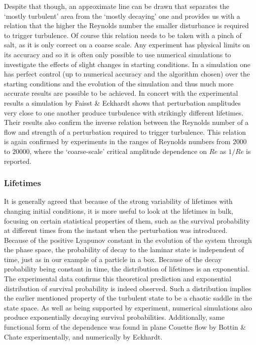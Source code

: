 \documentclass[11pt,a4paper]{article}
\begin{document}
Despite that though, an approximate line can be drawn that separates the `mostly turbulent' area from the `mostly decaying' one and provides us with a relation that the higher the Reynolds number the smaller disturbance is required to trigger turbulence.
Of course this relation needs to be taken with a pinch of salt, as it is only correct on a coarse scale\cite{Eckhardt07}.
Any experiment has physical limits on its accuracy and so it is often only possible to use numerical simulations to investigate the effects of slight changes in starting conditions.
In a simulation one has perfect control (up to numerical accuracy and the algorithm chosen) over the starting conditions and the evolution of the simulation and thus much more accurate results are possible to be achieved.
In concert with the experimental results a simulation by Faisst \& Eckhardt\cite{Faisst04} shows that perturbation amplitudes very close to one another produce turbulence with strikingly different lifetimes.
Their results also confirm the inverse relation between the Reynolds number of a flow and strength of a perturbation required to trigger turbulence.
This relation is again confirmed by experiments in the ranges of Reynolds numbers from \(2000\) to \(20000\), where the `coarse-scale' critical amplitude dependence on \(Re\) as \(1 / Re\) is reported\cite{Hof03}\cite{Hof04}\cite{Draad98}.

\subsubsection{Lifetimes}
It is generally agreed that because of the strong variability of lifetimes with changing initial conditions, it is more useful to look at the lifetimes in bulk, focusing on certain statistical properties of them, such as the survival probability at different times from the instant when the perturbation was introduced.
Because of the positive Lyapunov constant in the evolution of the system through the phase space, the probability of decay to the laminar state is independent of time, just as in our example of a particle in a box.
Because of the decay probability being constant in time, the distribution of lifetimes is an exponential\cite{Kadanoff84}.
The experimental data confirms this theoretical prediction and exponential distribution of survival probability is indeed observed.
Such a distribution implies the earlier mentioned property of the turbulent state to be a chaotic saddle in the state space.
As well as being supported by experiment, numerical simulations also produce exponentially decaying survival probabilities\cite{Eckhardt02}.
Additionally, same functional form of the dependence was found in plane Couette flow by Bottin \& Chate\cite{Bottin98} experimentally, and numerically by Eckhardt\cite{Eckhardt02}.
\end{document}
